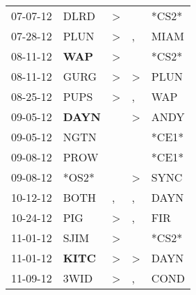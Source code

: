 \begin{supertabular}{p{0.07\textwidth}p{0.06\textwidth}p{0.02\textwidth}p{0.02\textwidth}p{0.06\textwidth}}
          07-07-12\textsuperscript{} &           DLRD\textsuperscript{} &     \textgreater &                  &                            *CS2* \\
          07-28-12\textsuperscript{} &           PLUN\textsuperscript{} &     \textgreater &                , &           MIAM\textsuperscript{} \\
          08-11-12\textsuperscript{} &   \textbf{WAP\textsuperscript{}} &     \textgreater &                  &                            *CS2* \\
          08-11-12\textsuperscript{} &           GURG\textsuperscript{} &     \textgreater &     \textgreater &           PLUN\textsuperscript{} \\
          08-25-12\textsuperscript{} &           PUPS\textsuperscript{} &     \textgreater &                , &            WAP\textsuperscript{} \\
          09-05-12\textsuperscript{} &  \textbf{DAYN\textsuperscript{}} &                  &     \textgreater &           ANDY\textsuperscript{} \\
          09-05-12\textsuperscript{} &           NGTN\textsuperscript{} &                  &                  &                            *CE1* \\
          09-08-12\textsuperscript{} &           PROW\textsuperscript{} &                  &                  &                            *CE1* \\
          09-08-12\textsuperscript{} &                            *OS2* &                  &     \textgreater &           SYNC\textsuperscript{} \\
          10-12-12\textsuperscript{} &           BOTH\textsuperscript{} &                , &                , &           DAYN\textsuperscript{} \\
          10-24-12\textsuperscript{} &            PIG\textsuperscript{} &     \textgreater &                , &            FIR\textsuperscript{} \\
          11-01-12\textsuperscript{} &           SJIM\textsuperscript{} &     \textgreater &                  &                            *CS2* \\
          11-01-12\textsuperscript{} &  \textbf{KITC\textsuperscript{}} &     \textgreater &     \textgreater &           DAYN\textsuperscript{} \\
          11-09-12\textsuperscript{} &           3WID\textsuperscript{} &     \textgreater &                , &           COND\textsuperscript{} \\

\end{supertabular}
